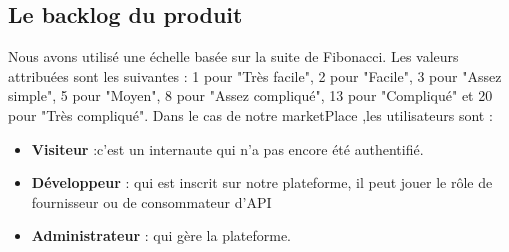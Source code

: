     \subsection{Le backlog du produit  } 
    Nous avons utilisé une échelle basée sur la suite de Fibonacci. Les valeurs attribuées sont les suivantes  : 1 pour "Très facile", 2 pour "Facile", 3 pour "Assez simple", 5 pour "Moyen", 8 pour "Assez compliqué", 13 pour "Compliqué" et 20 pour "Très compliqué". Dans le cas de notre marketPlace ,les utilisateurs sont : \\
    \begin{itemize}
        \item \textbf{Visiteur }:c’est un internaute qui n'a pas encore été authentifié.
        \item \textbf{Développeur  }: qui est inscrit sur notre plateforme, il peut jouer le rôle de fournisseur ou de consommateur d’API
        \item \textbf{Administrateur }: qui gère la plateforme.
    \end{itemize} 

